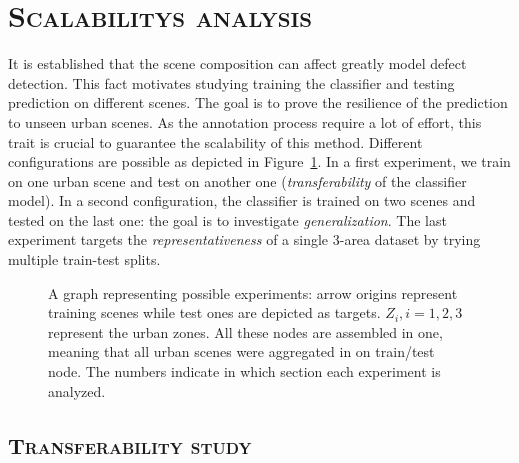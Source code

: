 \minitoc

\vfill

\clearpage

\section{\textsc{Scalabilitys analysis}}
    \label{sec::more_experiments::scalability}
    It is established that the scene composition can affect greatly model defect detection.
    This fact motivates studying training the classifier and testing prediction on different scenes.
    The goal is to prove the resilience of the prediction to unseen urban scenes.
    As the annotation process require a lot of effort, this trait is crucial to guarantee the scalability of this method.
    Different configurations are possible as depicted in Figure~\ref{fig::scalability_study}.
    In a first experiment, we train on one urban scene and test on another one (\textit{transferability} of the classifier model).
    In a second configuration, the classifier is trained on two scenes and tested on the last one: the goal is to investigate \textit{generalization}.
    The last experiment targets the \textit{representativeness} of a single 3-area dataset by trying multiple train-test splits.

    \begin{figure}[htbp]
        \ffigbox[\FBwidth]{
            
        }
        {
            \caption{\label{fig::scalability_study} A graph representing possible experiments: arrow origins represent training scenes while test ones are depicted as targets. \(Z_i, i=1,2,3\) represent the urban zones. All these nodes are assembled in one, meaning that all urban scenes were aggregated in on train/test node. The numbers indicate in which section each experiment is analyzed.}
        }
    \end{figure}

    \subsection{\textsc{Transferability study}}
        \subsubsection{\textsc{}}
        \subsubsection{\textsc{}}
